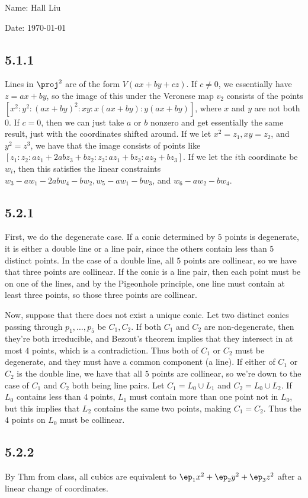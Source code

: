 \documentclass{article}
\begin{document}
Name: Hall Liu

Date: \today 
\vspace{1.5cm}
\subsection*{5.1.1}
Lines in $\proj^2$ are of the form $V(ax+by+cz)$. If $c\neq0$, we essentially have $z=ax+by$, so the image of this under the Veronese map $v_2$ consists of the points $[x^2:y^2:(ax+by)^2:xy:x(ax+by):y(ax+by)]$, where $x$ and $y$ are not both $0$. If $c=0$, then we can just take $a$ or $b$ nonzero and get essentially the same result, just with the coordinates shifted around. If we let $x^2=z_1,xy=z_2$, and $y^2=z^3$, we have that the image consists of points like $[z_1:z_2:az_1+2abz_3+bz_2:z_3:az_1+bz_3:az_2+bz_3]$. If we let the $i$th coordinate be $w_i$, then this satisfies the linear constraints $w_3-aw_1-2abw_4-bw_2,w_5-aw_1-bw_3$, and $w_6-aw_2-bw_4$.
\subsection*{5.2.1}
First, we do the degenerate case. If a conic determined by $5$ points is degenerate, it is either a double line or a line pair, since the others contain less than $5$ distinct points. In the case of a double line, all $5$ points are collinear, so we have that three points are collinear. If the conic is a line pair, then each point must be on one of the lines, and by the Pigeonhole principle, one line must contain at least three points, so those three points are collinear.

Now, suppose that there does not exist a unique conic. Let two distinct conics passing through $p_1,\ldots,p_5$ be $C_1,C_2$. If both $C_1$ and $C_2$ are non-degenerate, then they're both irreducible, and Bezout's theorem implies that they intersect in at most $4$ points, which is a contradiction. Thus both of $C_1$ or $C_2$ must be degenerate, and they must have a common component (a line). If either of $C_1$ or $C_2$ is the double line, we have that all $5$ points are collinear, so we're down to the case of $C_1$ and $C_2$ both being line pairs. Let $C_1=L_0\cup L_1$ and $C_2=L_0\cup L_2$. If $L_0$ contains less than $4$ points, $L_1$ must contain more than one point not in $L_0$, but this implies that $L_2$ contains the same two points, making $C_1=C_2$. Thus the $4$ points on $L_0$ must be collinear.
\subsection*{5.2.2}
By Thm from class, all cubics are equivalent to $\ep_1x^2+\ep_2y^2+\ep_3z^2$ after a linear change of coordinates. 
\end{document}
